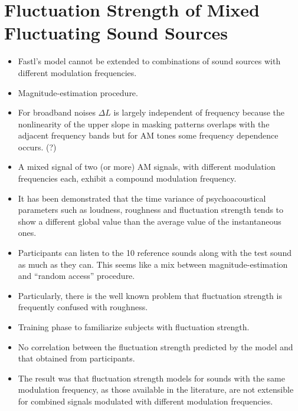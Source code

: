 \section{Fluctuation Strength of Mixed Fluctuating Sound Sources}

\begin{itemize}
    \item Fastl's model cannot be extended to combinations of sound sources with
        different modulation frequencies.
    \item Magnitude-estimation procedure.
    \item For broadband noises $\Delta L$ is largely independent of frequency
        because the nonlinearity of the upper slope in masking patterns overlaps
        with the adjacent frequency bands but for AM tones some frequency
        dependence occurs. (?)
    \item A mixed signal of two (or more) AM signals, with different modulation
        frequencies each, exhibit a compound modulation frequency.
    \item It has been demonstrated that the time variance of psychoacoustical
        parameters such as loudness, roughness and fluctuation strength tends to
        show a different global value than the average value of the
        instantaneous ones.
    \item Participants can listen to the 10 reference sounds along with the
        test sound as much as they can. This seems like a mix between
        magnitude-estimation and ``random access'' procedure.
    \item  Particularly, there is the well known problem that fluctuation
        strength is frequently confused with roughness.
    \item Training phase to familiarize subjects with fluctuation strength.
    \item No correlation between the fluctuation strength predicted by the model
        and that obtained from participants.
    \item  The result was that fluctuation strength models for sounds with the
        same modulation frequency, as those available in the literature, are not
        extensible for combined signals modulated with different modulation
        frequencies.
\end{itemize}
